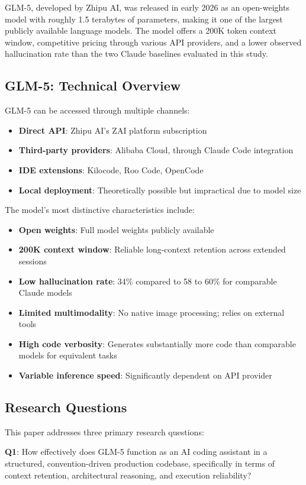 \documentclass[conference]{IEEEtran}
\begin{document}
GLM-5, developed by Zhipu AI, was released in early 2026 as an open-weights model with roughly 1.5 terabytes of parameters, making it one of the largest publicly available language models. The model offers a 200K token context window, competitive pricing through various API providers, and a lower observed hallucination rate than the two Claude baselines evaluated in this study.

\subsection{GLM-5: Technical Overview}
GLM-5 can be accessed through multiple channels:
\begin{itemize}
    \item \textbf{Direct API}: Zhipu AI's ZAI platform subscription
    \item \textbf{Third-party providers}: Alibaba Cloud, through Claude Code integration
    \item \textbf{IDE extensions}: Kilocode, Roo Code, OpenCode
    \item \textbf{Local deployment}: Theoretically possible but impractical due to model size
\end{itemize}

The model's most distinctive characteristics include:
\begin{itemize}
    \item \textbf{Open weights}: Full model weights publicly available
    \item \textbf{200K context window}: Reliable long-context retention across extended sessions
    \item \textbf{Low hallucination rate}: 34\% compared to 58 to 60\% for comparable Claude models
    \item \textbf{Limited multimodality}: No native image processing; relies on external tools
    \item \textbf{High code verbosity}: Generates substantially more code than comparable models for equivalent tasks
    \item \textbf{Variable inference speed}: Significantly dependent on API provider
\end{itemize}

\subsection{Research Questions}
This paper addresses three primary research questions:

\textbf{Q1}: How effectively does GLM-5 function as an AI coding assistant in a structured, convention-driven production codebase, specifically in terms of context retention, architectural reasoning, and execution reliability?
\end{document}
